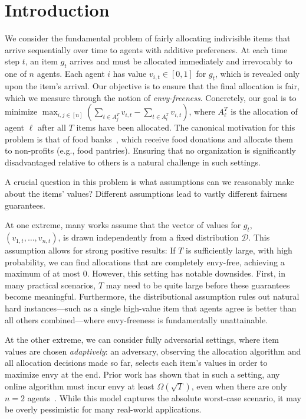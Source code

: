 \section{Introduction}

We consider the fundamental problem of fairly allocating indivisible items that arrive sequentially over time to agents with additive preferences. At each time step $t$, an item $g_t$ arrives and must be allocated immediately and irrevocably to one of $n$ agents. Each agent $i$ has value $v_{i,t} \in [0,1]$ for $g_t$, which is revealed only upon the item's arrival. Our objective is to ensure that the final allocation is fair, which we measure through the notion of \emph{envy-freeness}. Concretely, our goal is to minimize $\max_{i,j \in [n]} \left( \sum_{t \in A_j^T} v_{i,t} - \sum_{t \in A_i^T} v_{i,t} \right)$, where $A_{\ell}^T$ is the allocation of agent $\ell$ after all $T$ items have been allocated. 
The canonical motivation for this problem is that of food banks~\cite{aleksandrov2015online,lee2019webuildai,mertzanidis2024}, which receive food donations and allocate them to non-profits (e.g., food pantries). Ensuring that no organization is significantly disadvantaged relative to others is a natural challenge in such settings.


A crucial question in this problem is what assumptions can we reasonably make about the items' values? Different assumptions lead to vastly different fairness guarantees.

At one extreme, many works assume that the vector of values for $g_t$, $(v_{1, t}, \ldots, v_{n, t})$, is drawn independently from a fixed distribution $\mathcal{D}$. This assumption allows for strong positive results: If $T$ is sufficiently large, with high probability, we can find allocations that are completely envy-free, achieving a maximum of at most $0$. However, this setting has notable downsides. First, in many practical scenarios, $T$ may need to be quite large before these guarantees become meaningful. Furthermore, the distributional assumption rules out natural hard instances---such as a single high-value item that agents agree is better than all others combined---where envy-freeness is fundamentally unattainable.

At the other extreme, we can consider fully adversarial settings, where item values are chosen \emph{adaptively}: an adversary, observing the allocation algorithm and all allocation decisions made so far, selects each item's values in order to maximize envy at the end. Prior work has shown that in such a setting, any online algorithm must incur envy at least $\Omega(\sqrt{T})$, even when there are only $n=2$ agents~\cite{benade2024fair}. While this model captures the absolute worst-case scenario, it may be overly pessimistic for many real-world applications. 

